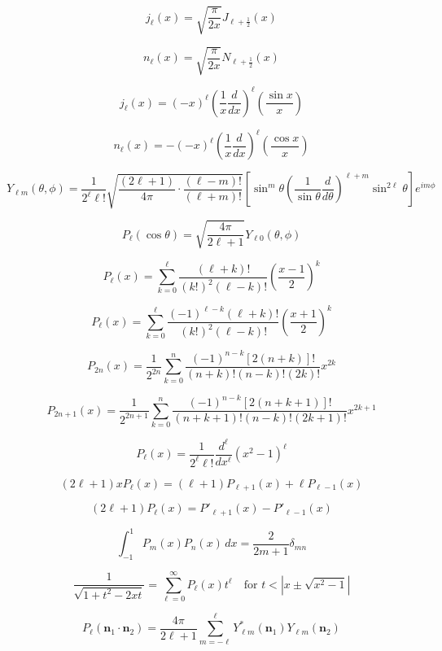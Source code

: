 \[
j_\ell(x) = \sqrt{\frac{\pi}{2x}} J_{\ell + \frac{1}{2}}(x)
\]

\[
n_\ell(x) = \sqrt{\frac{\pi}{2x}} N_{\ell + \frac{1}{2}}(x)
\]

\[
j_\ell(x) = (-x)^\ell \left( \frac{1}{x} \frac{d}{dx} \right)^\ell \left( \frac{\sin x}{x} \right)
\]

\[
n_\ell(x) = -(-x)^\ell \left( \frac{1}{x} \frac{d}{dx} \right)^\ell \left( \frac{\cos x}{x} \right)
\]

\[
Y_{\ell m}(\theta, \phi) = 
\frac{1}{2^\ell \ell!}
\sqrt{\frac{(2\ell + 1)}{4\pi} \cdot \frac{(\ell - m)!}{(\ell + m)!}}
\left[ \sin^m \theta \left( \frac{1}{\sin \theta} \frac{d}{d\theta} \right)^{\ell + m} \sin^{2\ell} \theta \right]
e^{im\phi}
\]

\[
P_\ell(\cos \theta) = \sqrt{\frac{4\pi}{2\ell + 1}} Y_{\ell 0}(\theta, \phi)
\]

\[
P_\ell(x) = \sum_{k=0}^\ell \frac{(\ell + k)!}{(k!)^2 (\ell - k)!} \left( \frac{x - 1}{2} \right)^k
\]

\[
P_\ell(x) = \sum_{k=0}^\ell \frac{(-1)^{\ell - k} (\ell + k)!}{(k!)^2 (\ell - k)!} \left( \frac{x + 1}{2} \right)^k
\]

\[
P_{2n}(x) = \frac{1}{2^{2n}} \sum_{k=0}^n \frac{(-1)^{n - k} [2(n + k)]!}{(n + k)! (n - k)! (2k)!} x^{2k}
\]

\[
P_{2n+1}(x) = \frac{1}{2^{2n+1}} \sum_{k=0}^n \frac{(-1)^{n - k} [2(n + k + 1)]!}{(n + k + 1)! (n - k)! (2k + 1)!} x^{2k + 1}
\]

\[
P_\ell(x) = \frac{1}{2^\ell \ell!} \frac{d^\ell}{dx^\ell} (x^2 - 1)^\ell
\]

\[
(2\ell + 1) x P_\ell(x) = (\ell + 1) P_{\ell + 1}(x) + \ell P_{\ell - 1}(x)
\]

\[
(2\ell + 1) P_\ell(x) = P'_{\ell + 1}(x) - P'_{\ell - 1}(x)
\]

\[
\int_{-1}^1 P_m(x) P_n(x)\, dx = \frac{2}{2m + 1} \delta_{mn}
\]

\[
\frac{1}{\sqrt{1 + t^2 - 2xt}} = \sum_{\ell = 0}^\infty P_\ell(x) t^\ell
\quad \text{for } t < \left| x \pm \sqrt{x^2 - 1} \right|
\]

\[
P_\ell(\mathbf{n}_1 \cdot \mathbf{n}_2) = \frac{4\pi}{2\ell + 1} \sum_{m = -\ell}^\ell Y_{\ell m}^*(\mathbf{n}_1) Y_{\ell m}(\mathbf{n}_2)
\]